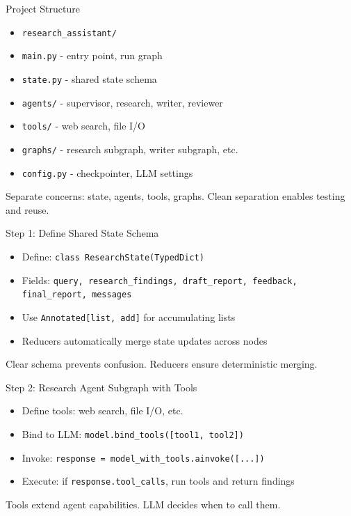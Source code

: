 \documentclass[aspectratio=169,11pt]{beamer}
\begin{document}
\begin{frame}{Project Structure}
\setlength{\itemsep}{1pt}
{\footnotesize
\begin{itemize}
\item \texttt{research\_assistant/}
\item \quad \texttt{main.py} - entry point, run graph
\item \quad \texttt{state.py} - shared state schema
\item \quad \texttt{agents/} - supervisor, research, writer, reviewer
\item \quad \texttt{tools/} - web search, file I/O
\item \quad \texttt{graphs/} - research subgraph, writer subgraph, etc.
\item \quad \texttt{config.py} - checkpointer, LLM settings
\end{itemize}
}
\vspace{0.1cm}
\begin{tipbox}[Organization]
Separate concerns: state, agents, tools, graphs. Clean separation enables testing and reuse.
\end{tipbox}
\end{frame}

\begin{frame}{Step 1: Define Shared State Schema}
\setlength{\itemsep}{1pt}
\begin{itemize}
\item Define: \texttt{class ResearchState(TypedDict)}
\item Fields: \texttt{query, research\_findings, draft\_report, feedback, final\_report, messages}
\item Use \texttt{Annotated[list, add]} for accumulating lists
\item Reducers automatically merge state updates across nodes
\end{itemize}
\vspace{0.1cm}
\begin{tipbox}
Clear schema prevents confusion. Reducers ensure deterministic merging.
\end{tipbox}
\end{frame}

\begin{frame}{Step 2: Research Agent Subgraph with Tools}
\setlength{\itemsep}{1pt}
\begin{itemize}
\item Define tools: web search, file I/O, etc.
\item Bind to LLM: \texttt{model.bind\_tools([tool1, tool2])}
\item Invoke: \texttt{response = model\_with\_tools.ainvoke([...])}
\item Execute: if \texttt{response.tool\_calls}, run tools and return findings
\end{itemize}
\vspace{0.1cm}
\begin{tipbox}
Tools extend agent capabilities. LLM decides when to call them.
\end{tipbox}
\end{frame}
\end{document}
